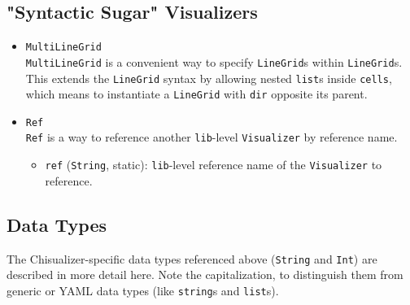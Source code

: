\documentclass[11pt]{article}
\begin{document}
\subsection {"Syntactic Sugar" Visualizers}
\begin{itemize}
  \item \texttt{MultiLineGrid} \\
  \texttt{MultiLineGrid} is a convenient way to specify \texttt{LineGrid}s within \texttt{LineGrid}s. This extends the \texttt{LineGrid} syntax by allowing nested \texttt{list}s inside \texttt{cells}, which means to instantiate a \texttt{LineGrid} with \texttt{dir} opposite its parent.
  \item \texttt{Ref} \\
  \texttt{Ref} is a way to reference another \texttt{lib}-level \texttt{Visualizer} by reference name.
  \begin{itemize}
    \item \texttt{ref} (\texttt{String}, static): \texttt{lib}-level reference name of the \texttt{Visualizer} to reference.
  \end{itemize}
\end{itemize}

\subsection {Data Types}
The Chisualizer-specific data types referenced above (\texttt{String} and \texttt{Int}) are described in more detail here. Note the capitalization, to distinguish them from generic or YAML data types (like \texttt{string}s and \texttt{list}s).
\end{document}
